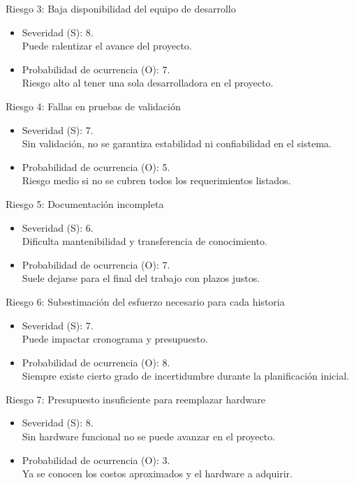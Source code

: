 \documentclass[
11pt, %
]{charter}
\begin{document}
Riesgo 3: Baja disponibilidad del equipo de desarrollo
\begin{itemize}
	\item Severidad (S): 8. \\
	Puede ralentizar el avance del proyecto.
	\item Probabilidad de ocurrencia (O): 7. \\
	Riesgo alto al tener una sola desarrolladora en el proyecto.
\end{itemize}   

Riesgo 4: Fallas en pruebas de validación
\begin{itemize}
	\item Severidad (S): 7. \\
	Sin validación, no se garantiza estabilidad ni confiabilidad en el sistema.
	\item Probabilidad de ocurrencia (O): 5. \\
	Riesgo medio si no se cubren todos los requerimientos listados.
\end{itemize}   

Riesgo 5: Documentación incompleta
\begin{itemize}
	\item Severidad (S): 6. \\
	Dificulta mantenibilidad y transferencia de conocimiento.
	\item Probabilidad de ocurrencia (O): 7. \\
	Suele dejarse para el final del trabajo con plazos justos.
\end{itemize}   

Riesgo 6: Subestimación del esfuerzo necesario para cada historia
\begin{itemize}
	\item Severidad (S): 7. \\
	Puede impactar cronograma y presupuesto.
	\item Probabilidad de ocurrencia (O): 8. \\
	Siempre existe cierto grado de incertidumbre durante la planificación inicial.
\end{itemize}   

Riesgo 7: Presupuesto insuficiente para reemplazar hardware
\begin{itemize}
	\item Severidad (S): 8. \\
	Sin hardware funcional no se puede avanzar en el proyecto.
	\item Probabilidad de ocurrencia (O): 3. \\
	Ya se conocen los costos aproximados y el hardware a adquirir.
\end{itemize}  
\end{document}
